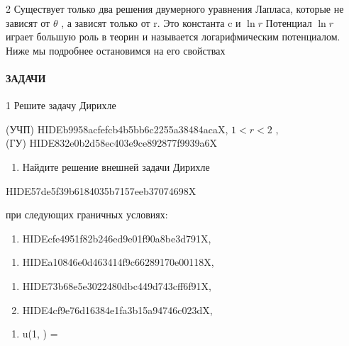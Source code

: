\documentclass[
  ukrainian,
]{article}
\providecommand{\tightlist}{%
  \setlength{\itemsep}{0pt}\setlength{\parskip}{0pt}}
\begin{document}
2 Существует только два решения двумерного уравнения Лапласа, которые не
зависят от \(\theta\) , а зависят только от r. Это константа c и
\(\ln r\) Потенциал \(\ln r\) играет большую роль в теорин и называется
логарифмическим потенциалом. Ниже мы подробнее остановимся на его
свойствах

\paragraph{ЗАДАЧИ}\label{ux437ux430ux434ux430ux447ux438-2}

1 Решите задачу Дирихле

(УЧП) HIDEb9958acfefcb4b5bb6c2255a38484acaX, \(1 < r < 2\) ,\\
(ГУ) HIDE832e0b2d58ec403e9ce892877f9939a6X

\begin{enumerate}
\def\labelenumi{\arabic{enumi}.}
\setcounter{enumi}{1}
\tightlist
\item
  Найдите решение внешней задачи Дирихле
\end{enumerate}

HIDE57de5f39b6184035b7157eeb37074698X

при следующих граничных условиях:

\begin{enumerate}
\def\labelenumi{\alph{enumi})}
\tightlist
\item
  HIDEcfe4951f82b246ed9e01f90a8be3d791X,
\end{enumerate}

\begin{enumerate}
\def\labelenumi{\arabic{enumi})}
\setcounter{enumi}{5}
\tightlist
\item
  HIDEa10846e0d463414f9c66289170e00118X,
\end{enumerate}

\begin{enumerate}
\def\labelenumi{\Alph{enumi})}
\setcounter{enumi}{1}
\item
  HIDE73b68e5e3022480dbc449d743cff6f91X,
\item
  HIDE4cf9e76d16384e1fa3b15a94746c023dX,\\
\end{enumerate}

\begin{enumerate}
\def\labelenumi{\alph{enumi})}
\setcounter{enumi}{17}
\tightlist
\item
  u(1, \theta) =
\end{enumerate}
\end{document}
